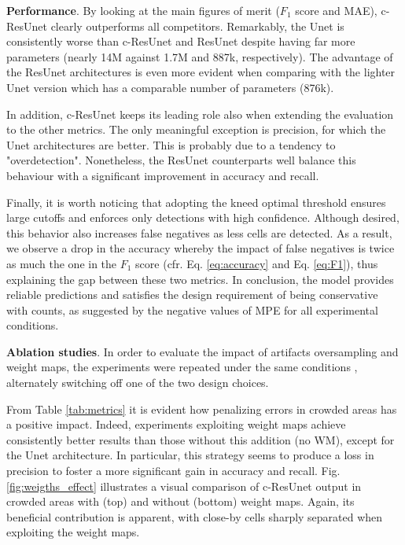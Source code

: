 \noindent\textbf{Performance}.
By looking at the main figures of merit ($F_1$ score and MAE), c-ResUnet clearly outperforms all competitors.
Remarkably, the Unet is consistently worse than c-ResUnet and ResUnet despite having far more parameters (nearly 14M against 1.7M and 887k, respectively).
The advantage of the ResUnet architectures is even more evident when comparing with the lighter Unet version which has a comparable number of parameters (876k).

In addition, c-ResUnet keeps its leading role also when extending the evaluation to the other metrics.
The only meaningful exception is precision, for which the Unet architectures are better. This is probably due to a tendency to "overdetection". 
Nonetheless, the ResUnet counterparts well balance this behaviour with a significant improvement in accuracy and recall.

Finally, it is worth noticing that adopting the kneed optimal threshold ensures large cutoffs and enforces only detections with high confidence.
Although desired, this behavior also increases false negatives as less cells are detected. 
As a result, we observe a drop in the accuracy whereby the impact of false negatives is twice as much the one in the $F_1$ score (cfr. Eq. \eqref{eq:accuracy} and Eq. \eqref{eq:F1}), thus explaining the gap between these two metrics.
In conclusion, the model provides reliable predictions and satisfies the design requirement of being conservative with counts, as suggested by the negative values of MPE for all experimental conditions.

\noindent\textbf{Ablation studies}.
In order to evaluate the impact of artifacts oversampling and weight maps, the experiments were repeated under the same conditions
, alternately switching off one of the two design choices.

From Table \ref{tab:metrics} it is evident how penalizing errors in crowded areas has a positive impact. Indeed, experiments exploiting weight maps achieve consistently better results than those without this addition (no WM), except for the Unet architecture.  
In particular, this strategy seems to produce a loss in precision to foster a more significant gain in accuracy and recall.
Fig. \ref{fig:weigths_effect} illustrates a visual comparison of c-ResUnet output in crowded areas with (top) and without (bottom) weight maps. 
Again, its beneficial contribution is apparent, with close-by cells sharply separated when exploiting the weight maps.


